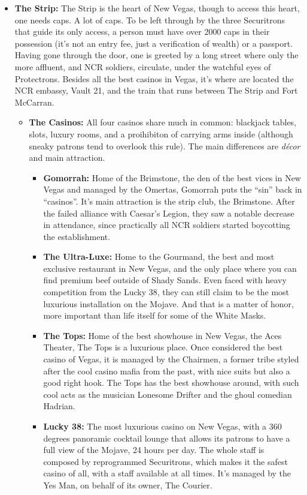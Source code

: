 \documentclass[11pt]{article} %
\begin{document}
\begin{itemize}
	\item \textbf{The Strip:} The Strip is the heart of New Vegas, though to access this heart, one needs caps. A lot of caps. To be left through by the three Securitrons that guide its only access, a person must have over 2000 caps in their possession (it's not an entry fee, just a verification of wealth) or a passport. Having gone through the door, one is greeted by a long street where only the more affluent, and NCR soldiers, circulate, under the watchful eyes of Protectrons. Besides all the best casinos in Vegas, it's where are located the NCR embassy, Vault 21, and the train that runs between The Strip and Fort McCarran. 
	\begin{itemize}
		\item \textbf{The Casinos:} All four casinos share much in common: blackjack tables, slots, luxury rooms, and a proihibiton of carrying arms inside (although sneaky patrons tend to overlook this rule). The main differences are \textit{décor} and main attraction. 
	\begin{itemize}
		\item \textbf{Gomorrah:} Home of the Brimstone, the den of the best vices in New Vegas and managed by the Omertas, Gomorrah puts the ``sin'' back in ``casinos''. It's main attraction is the strip club, the Brimstone. After the failed alliance with Caesar's Legion, they saw a notable decrease in attendance, since practically all NCR soldiers started boycotting the establishment.
		\item \textbf{The Ultra-Luxe:} Home to the Gourmand, the best and most exclusive restaurant in New Vegas, and the only place where you can find premium beef outside of Shady Sands. Even faced with heavy competition from the Lucky 38, they can still claim to be the most luxurious installation on the Mojave. And that is a matter of honor, more important than life itself for some of the White Masks.
		\item \textbf{The Tops:} Home of the best showhouse in New Vegas, the Aces Theater, The Tops is a luxurious place. Once considered the best casino of Vegas, it is managed by the Chairmen, a former tribe styled after the cool casino mafia from the past, with nice suits but also a good right hook. The Tops has the best showhouse around, with such cool acts as the musician Lonesome Drifter and the ghoul comedian Hadrian.
		\item \textbf{Lucky 38:} The most luxurious casino on New Vegas, with a 360 degrees panoramic cocktail lounge that allows its patrons to have a full view of the Mojave, 24 hours per day. The whole staff is composed by reprogrammed Securitrons, which makes it the safest casino of all, with a staff available at all times. It's managed by the Yes Man, on behalf of its owner, The Courier.
	\end{itemize}
\end{itemize}


\end{itemize}
\end{document}
